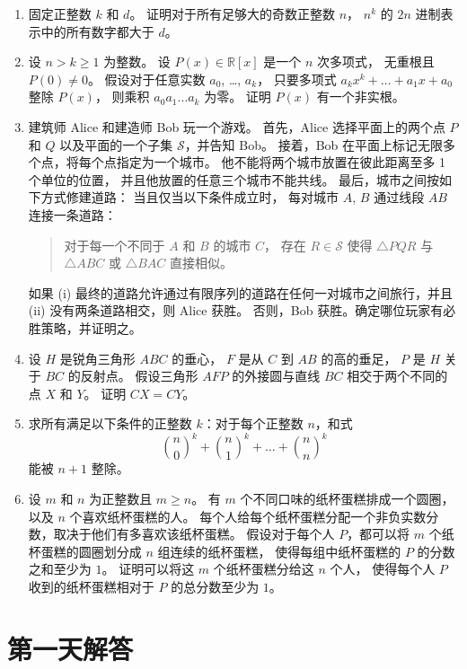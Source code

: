 \documentclass[11pt]{article}
\theoremstyle{claimstyle}
\theoremstyle{remarkstyle}
\begin{document}
\begin{enumerate}
\item 固定正整数 $k$ 和 $d$。
证明对于所有足够大的奇数正整数 $n$，
$n^k$ 的 $2n$ 进制表示中的所有数字都大于 $d$。

\item 设 $n > k \ge 1$ 为整数。
设 $P(x) \in \mathbb{R}[x]$ 是一个 $n$ 次多项式，
无重根且 $P(0) \neq 0$。
假设对于任意实数 $a_0$, \dots, $a_k$，
只要多项式 $a_k x^k + \dots + a_1 x + a_0$ 整除 $P(x)$，
则乘积 $a_0 a_1 \dots a_k$ 为零。
证明 $P(x)$ 有一个非实根。

\item 建筑师 Alice 和建造师 Bob 玩一个游戏。
首先，Alice 选择平面上的两个点 $P$ 和 $Q$ 以及平面的一个子集 $\mathcal{S}$，并告知 Bob。
接着，Bob 在平面上标记无限多个点，将每个点指定为一个城市。
他不能将两个城市放置在彼此距离至多 1 个单位的位置，
并且他放置的任意三个城市不能共线。
最后，城市之间按如下方式修建道路：
当且仅当以下条件成立时，
每对城市 $A$, $B$ 通过线段 $AB$ 连接一条道路：
\begin{quote}
对于每一个不同于 $A$ 和 $B$ 的城市 $C$，
存在 $R\in \mathcal{S}$ 使得 $\triangle PQR$ 与 $\triangle ABC$ 或 $\triangle BAC$ 直接相似。
\end{quote}
如果 (i) 最终的道路允许通过有限序列的道路在任何一对城市之间旅行，并且 (ii) 没有两条道路相交，则 Alice 获胜。
否则，Bob 获胜。确定哪位玩家有必胜策略，并证明之。

\item 设 $H$ 是锐角三角形 $ABC$ 的垂心，
$F$ 是从 $C$ 到 $AB$ 的高的垂足，
$P$ 是 $H$ 关于 $BC$ 的反射点。
假设三角形 $AFP$ 的外接圆与直线 $BC$ 相交于两个不同的点 $X$ 和 $Y$。
证明 $CX = CY$。

\item 求所有满足以下条件的正整数 $k$：对于每个正整数 $n$，和式
\[ \binom n0^k + \binom n1^k + \dots + \binom nn^k \]
能被 $n+1$ 整除。

\item 设 $m$ 和 $n$ 为正整数且 $m\geq n$。
有 $m$ 个不同口味的纸杯蛋糕排成一个圆圈，以及 $n$ 个喜欢纸杯蛋糕的人。
每个人给每个纸杯蛋糕分配一个非负实数分数，取决于他们有多喜欢该纸杯蛋糕。
假设对于每个人 $P$，都可以将 $m$ 个纸杯蛋糕的圆圈划分成 $n$ 组连续的纸杯蛋糕，
使得每组中纸杯蛋糕的 $P$ 的分数之和至少为 $1$。
证明可以将这 $m$ 个纸杯蛋糕分给这 $n$ 个人，
使得每个人 $P$ 收到的纸杯蛋糕相对于 $P$ 的总分数至少为 $1$。

\end{enumerate}
\pagebreak

\section{第一天解答}
\end{document}
